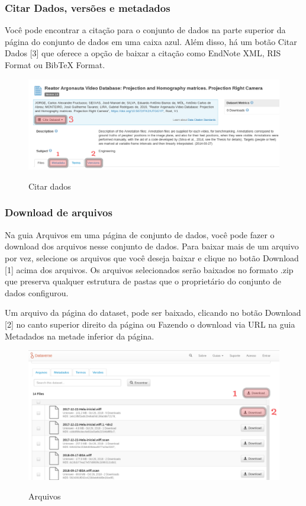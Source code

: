 \documentclass[12pt,hidelinks]{article}
\begin{document}
	    \subsubsection{Citar Dados, versões e metadados}
	   
\qquad Você pode encontrar a citação para o conjunto de dados na parte superior da página do conjunto de dados em uma caixa azul. Além disso, há um botão Citar Dados [3] que oferece a opção de baixar a citação como EndNote XML, RIS Format ou BibTeX Format.
	    
\begin{figure}[H]
\caption{Citar dados}
\centering
    \includegraphics[width=1.0\textwidth]{imagens/PFVFU.png}
    \label{print2}
\end{figure}


    	\subsubsection{Download de arquivos}
    	
\qquad Na guia Arquivos em uma página de conjunto de dados, você pode fazer o download dos arquivos nesse conjunto de dados. Para baixar mais de um arquivo por vez, selecione os arquivos que você deseja baixar e clique no botão Download [1] acima dos arquivos. Os arquivos selecionados serão baixados no formato .zip que preserva qualquer estrutura de pastas que o proprietário do conjunto de dados configurou.

Um arquivo da página do dataset, pode ser baixado, clicando no botão Download [2] no canto superior direito da página ou Fazendo o download via URL na guia Metadados na metade inferior da página.

\begin{figure}[H]
\caption{Arquivos}
\centering
    \includegraphics[width=1.0\textwidth]{Prints/p3.png}
    \label{print3}
\end{figure}
\end{document}
